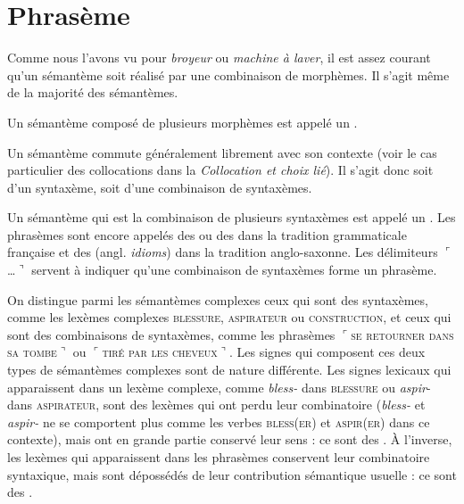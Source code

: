 \section{Phrasème}\label{sec:2.3.7}

Comme nous l’avons vu pour \textit{broyeur} ou \textit{machine à laver}, il est assez courant qu’un sémantème soit réalisé par une combinaison de morphèmes. Il s’agit même de la majorité des sémantèmes.

{Un sémantème composé de plusieurs morphèmes est appelé un .}

Un sémantème commute généralement librement avec son contexte (voir le cas particulier des collocations dans la  \textit{Collocation et choix lié}). Il s’agit donc soit d’un syntaxème, soit d’une combinaison de syntaxèmes.

{Un sémantème qui est la combinaison de plusieurs syntaxèmes est appelé un . Les phrasèmes sont encore appelés des  ou des  dans la tradition grammaticale française et des  (angl. \textit{idioms}) dans la tradition anglo-saxonne. Les délimiteurs $⌜$…$⌝$ servent à indiquer qu’une combinaison de syntaxèmes forme un phrasème.}


On distingue parmi les sémantèmes complexes ceux qui sont des syntaxèmes, comme les lexèmes complexes \textsc{blessure,} \textsc{aspirateur} ou \textsc{construction,} et ceux qui sont des combinaisons de syntaxèmes, comme les phrasèmes $⌜$\textsc{se} \textsc{retourner} \textsc{dans} \textsc{sa} \textsc{tombe}$⌝$ ou $⌜$\textsc{tiré} \textsc{par} \textsc{les} \textsc{cheveux}$⌝$. Les signes qui composent ces deux types de sémantèmes complexes sont de nature différente. Les signes lexicaux qui apparaissent dans un lexème complexe, comme \textit{bless-} dans \textsc{blessure} ou \textit{aspir}{}- dans \textsc{aspirateur}, sont des lexèmes qui ont perdu leur combinatoire (\textit{bless-} et \textit{aspir-} ne se comportent plus comme les verbes \textsc{bless}(\textsc{er}) et \textsc{aspir}(\textsc{er}) dans ce contexte), mais ont en grande partie conservé leur sens : ce sont des . À l’inverse, les lexèmes qui apparaissent dans les phrasèmes conservent leur combinatoire syntaxique, mais sont dépossédés de leur contribution sémantique usuelle : ce sont des .

